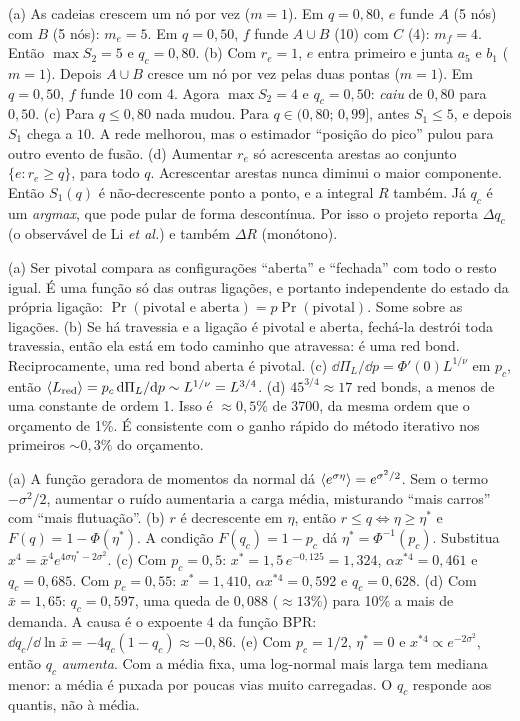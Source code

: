 \documentclass[11pt]{article}
\begin{document}
(a) As cadeias crescem um nó por vez ($m=1$). Em $q=0{,}80$, $e$ funde $A$ (5 nós) com $B$ (5 nós): $m_e=5$. Em $q=0{,}50$, $f$ funde $A\cup B$ (10) com $C$ (4): $m_f=4$. Então $\max S_2 = 5$ e $q_c=0{,}80$.
(b) Com $r_e=1$, $e$ entra primeiro e junta $a_5$ e $b_1$ ($m=1$). Depois $A\cup B$ cresce um nó por vez pelas duas pontas ($m=1$). Em $q=0{,}50$, $f$ funde 10 com 4. Agora $\max S_2 = 4$ e $q_c = 0{,}50$: \emph{caiu} de $0{,}80$ para $0{,}50$.
(c) Para $q\le 0{,}80$ nada mudou. Para $q\in(0{,}80;\,0{,}99]$, antes $S_1\le5$, e depois $S_1$ chega a $10$. A rede melhorou, mas o estimador ``posição do pico'' pulou para outro evento de fusão.
(d) Aumentar $r_e$ só acrescenta arestas ao conjunto $\{e: r_e\ge q\}$, para todo $q$. Acrescentar arestas nunca diminui o maior componente. Então $S_1(q)$ é não-decrescente ponto a ponto, e a integral $R$ também. Já $q_c$ é um \emph{argmax}, que pode pular de forma descontínua. Por isso o projeto reporta $\Delta q_c$ (o observável de Li \emph{et al.}) e também $\Delta R$ (monótono).

(a) Ser pivotal compara as configurações ``aberta'' e ``fechada'' com todo o resto igual. É uma função só das outras ligações, e portanto independente do estado da própria ligação: $\Pr(\text{pivotal e aberta}) = p\Pr(\text{pivotal})$. Some sobre as ligações. (b) Se há travessia e a ligação é pivotal e aberta, fechá-la destrói toda travessia, então ela está em todo caminho que atravessa: é uma red bond. Reciprocamente, uma red bond aberta é pivotal. (c) $\dd\Pi_L/\dd p = \Phi'(0)L^{1/\nu}$ em $p_c$, então $\left\langle L_{\rm red} \right\rangle = p_c\,\mathrm{d}\Pi_L/\mathrm{d} p\sim L^{1/\nu}=L^{3/4}$. (d) $45^{3/4}\approx17$ red bonds, a menos de uma constante de ordem 1. Isso é $\approx 0{,}5\%$ de 3700, da mesma ordem que o orçamento de 1\%. É consistente com o ganho rápido do método iterativo nos primeiros $\sim 0{,}3\%$ do orçamento.

(a) A função geradora de momentos da normal dá $\left\langle e^{\sigma\eta} \right\rangle = e^{\sigma^2/2}$. Sem o termo $-\sigma^2/2$, aumentar o ruído aumentaria a carga média, misturando ``mais carros'' com ``mais flutuação''. (b) $r$ é decrescente em $\eta$, então $r\le q\iff\eta\ge\eta^*$ e $F(q)=1-\Phi(\eta^*)$. A condição $F(q_c)=1-p_c$ dá $\eta^* = \Phi^{-1}(p_c)$. Substitua $x^4 = \bar x^4 e^{4\sigma\eta^*-2\sigma^2}$. (c) Com $p_c=0{,}5$: $x^*=1{,}5\,e^{-0{,}125}=1{,}324$, $\alpha x^{*4}=0{,}461$ e $q_c = 0{,}685$. Com $p_c=0{,}55$: $x^*=1{,}410$, $\alpha x^{*4} = 0{,}592$ e $q_c = 0{,}628$. (d) Com $\bar x = 1{,}65$: $q_c = 0{,}597$, uma queda de $0{,}088$ ($\approx13\%$) para 10\% a mais de demanda. A causa é o expoente $4$ da função BPR: $\dd q_c/\dd\ln\bar x = -4q_c(1-q_c)\approx-0{,}86$. (e) Com $p_c=1/2$, $\eta^*=0$ e $x^{*4}\propto e^{-2\sigma^2}$, então $q_c$ \emph{aumenta}. Com a média fixa, uma log-normal mais larga tem mediana menor: a média é puxada por poucas vias muito carregadas. O $q_c$ responde aos quantis, não à média.
\end{document}

